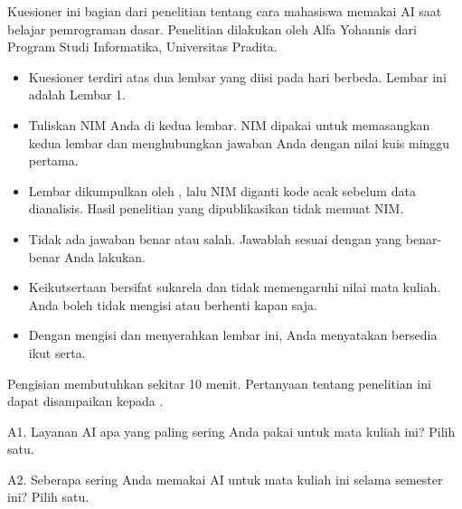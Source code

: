 \documentclass[11pt]{article}
\begin{document}

Kuesioner ini bagian dari penelitian tentang cara mahasiswa memakai AI saat belajar pemrograman dasar. Penelitian dilakukan oleh Alfa Yohannis dari Program Studi Informatika, Universitas Pradita.

\begin{itemize}
  \setlength{\itemsep}{0pt}
  \item Kuesioner terdiri atas dua lembar yang diisi pada hari berbeda. Lembar ini adalah Lembar 1.
  \item Tuliskan NIM Anda di kedua lembar. NIM dipakai untuk memasangkan kedua lembar dan menghubungkan jawaban Anda dengan nilai kuis minggu pertama.
  \item Lembar dikumpulkan oleh , lalu NIM diganti kode acak sebelum data dianalisis. Hasil penelitian yang dipublikasikan tidak memuat NIM.
  \item Tidak ada jawaban benar atau salah. Jawablah sesuai dengan yang benar-benar Anda lakukan.
  \item Keikutsertaan bersifat sukarela dan tidak memengaruhi nilai mata kuliah. Anda boleh tidak mengisi atau berhenti kapan saja.
  \item Dengan mengisi dan menyerahkan lembar ini, Anda menyatakan bersedia ikut serta.
\end{itemize}

Pengisian membutuhkan sekitar 10 menit. Pertanyaan tentang penelitian ini dapat disampaikan kepada .

\kotaknim


A1. Layanan AI apa yang paling sering Anda pakai untuk mata kuliah ini? Pilih satu.

\begin{barispilihan}
\end{barispilihan}

A2. Seberapa sering Anda memakai AI untuk mata kuliah ini selama semester ini? Pilih satu.

\begin{barispilihan}
\end{barispilihan}
\end{document}
